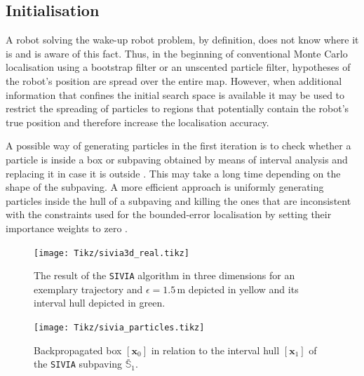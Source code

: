 \subsection{Initialisation}\label{sec:filter_initialisation}

A robot solving the wake-up robot problem, by definition, does not know where it is and is aware of this fact. Thus, in the beginning of conventional Monte Carlo localisation using a bootstrap filter or an unscented particle filter, hypotheses of the robot's position are spread over the entire map. However, when additional information that confines the initial search space is available it may be used to restrict the spreading of particles to regions that  potentially contain the robot's true position and therefore increase the localisation accuracy.

A possible way of generating particles in the first iteration is to check whether a particle is inside a box or subpaving obtained by means of interval analysis and replacing it in case it is outside \cite{MACHADOCOELHO2017405, neulandh_ybridazation, neuland_set_inversion}. This may take a long time depending on the shape of the subpaving. A more efficient approach is uniformly generating particles inside the hull of a subpaving and killing the ones that are inconsistent with the constraints used for the bounded-error localisation by setting their importance weights to zero \cite{SHAO2010143}. 

\begin{figure}
	\centering
	\setlength{} 	
	\setlength{}		
	\texttt{[image: Tikz/sivia3d\_real.tikz]}		
	\caption[The result of the \texttt{SIVIA} algorithm in three dimensions for an exemplary trajectory.]{The result of the \texttt{SIVIA} algorithm in three dimensions for an exemplary trajectory and $\epsilon = 1.5\,$m depicted in yellow and its interval hull depicted in green.}		
	\label{fig:sivia3d_real}			
\end{figure}


\begin{figure}
	\centering
	\setlength{} 	
	\setlength{}		
	\texttt{[image: Tikz/sivia\_particles.tikz]}	
	\caption[Backpropagated box in relation to the interval hull of a \texttt{SIVIA} subpaving.]{Backpropagated box $[\bm{x}_0]$ in relation to the interval hull $[\bm{x}_1]$ of the \texttt{SIVIA} subpaving $\bar{\mathbb{S}}_1$.}			
	\label{fig:sivia_particles}			
\end{figure}


